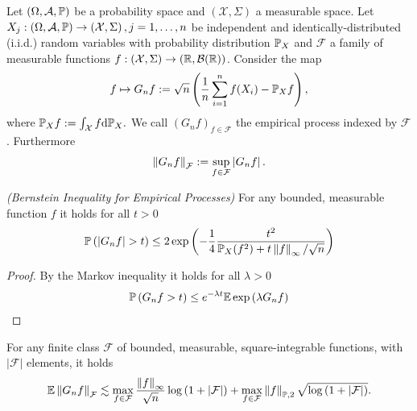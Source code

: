 
Let 
$
  \left( 
    \Omega,
    \mathcal{A},
    \P
  \right)
$
be a probability space
and
$
  \left( 
    \mathcal{X},
    \Sigma
  \right)
$
a measurable space.
Let 
$
  X_j
  :
  \left( 
    \Omega,
    \mathcal{A},
    \P
  \right)
  \to
  \left( 
    \mathcal{X},
    \Sigma
  \right)
  ,
  j=1,\ldots, n
$ be independent and identically-distributed (i.i.d.)
random variables
with probability distribution $\P_X$ 
and
$\mathcal{F}$ a family of measurable functions
$
  f:
  \left( 
    \mathcal{X},
    \Sigma
  \right)
    \to
  \left( 
    \R,
    \mathcal{B}(\R)
  \right)
$.
Consider the map
\begin{gather}
  f
  \mapsto
  G_n f
  :=
  \sqrt{n}
  \left( 
    \frac{1}{n}
    \sum_{i = 1}^{n}
      f(X_i)
    -
    \P_X f
  \right),
\end{gather}
where
$
  \P_X f 
  :=
  \int_\mathcal{X} f \text{d}\P_X.
$
We call 
$
  \left( 
    G_n f
  \right)_{f \in \mathcal{F}}
$
the empirical process indexed by $\mathcal{F}$.
Furthermore
\begin{gather}
  \norm{G_n f}_\mathcal{F}
  :=
  \sup_
        { f \in \mathcal{F}}
        \left|
          G_n f
        \right|
        .
\end{gather}

\begin{lemma}
  \emph{(Bernstein Inequality for Empirical Processes)}
  For any bounded, measurable function $f$
  it holds for all $t > 0$
  \begin{gather}
    \P 
    \left(
      \left| 
        G_n f
      \right|
      >
      t
    \right)
    \le
    2
    \exp
    \left( 
      - \frac{1}{4}
      \frac{t^2}
      {
        \P_X(f^2)
        +
        t
        \norm{f}_\infty
        /
        \sqrt{n}
      }
    \right)
  \end{gather}
\end{lemma}
\begin{proof}
  By the Markov inequality it holds for all $\lambda > 0$
  \begin{gather}
    \P
    \left( 
      G_n f 
      > 
      t
    \right)
    \le
    e^{-\lambda t}
    \E
    \exp
    \left( 
      \lambda
      G_n f 
    \right)
  \end{gather}
\end{proof}


\begin{lemma}
  For any finite class $\mathcal{F}$ of bounded, measurable, square-integrable functions, with $\left| \mathcal{F} \right|$ elements, it holds
  \begin{gather}
    \E \norm{G_n f}_\mathcal{F}
    \lesssim
    \max_
          {f \in \mathcal{F}}
          \frac{\norm{f}_\infty}{\sqrt{n}}
          \log
          \left( 1 + \left| \mathcal{F} \right| \right)
          +
          \max_
              {f \in \mathcal{F}}
              \norm{f}_{\P,2}
              \sqrt{
                \log \left( 
                  1 + \left| \mathcal{F} \right|
                \right)
              }
              .
  \end{gather}
\end{lemma}
